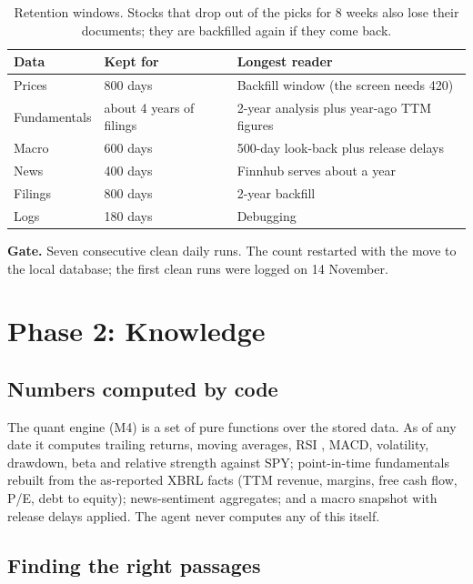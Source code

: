 \documentclass[11pt,a4paper]{article}
\begin{document}
\begin{table}[htbp]
\centering\small
\begin{tabular}{@{}lll@{}}
\toprule
Data & Kept for & Longest reader \\
\midrule
Prices        & 800 days & Backfill window (the screen needs 420) \\
Fundamentals  & about 4 years of filings & 2-year analysis plus year-ago TTM figures \\
Macro         & 600 days & 500-day look-back plus release delays \\
News          & 400 days & Finnhub serves about a year \\
Filings       & 800 days & 2-year backfill \\
Logs          & 180 days & Debugging \\
\bottomrule
\end{tabular}
\caption{Retention windows. Stocks that drop out of the picks for 8 weeks also lose their documents;
they are backfilled again if they come back.}
\label{tab:retention}
\end{table}

\textbf{Gate.} Seven consecutive clean daily runs. The count restarted with the move to the local
database; the first clean runs were logged on 14 November.

\section{Phase 2: Knowledge}

\subsection{Numbers computed by code}

The quant engine (M4) is a set of pure functions over the stored data. As of any date it computes
trailing returns, moving averages, RSI \cite{wilder1978new}, MACD, volatility, drawdown, beta and
relative strength against SPY; point-in-time fundamentals rebuilt from the as-reported XBRL facts (TTM
revenue, margins, free cash flow, P/E, debt to equity); news-sentiment aggregates; and a macro snapshot
with release delays applied. The agent never computes any of this itself.

\subsection{Finding the right passages}
\end{document}
